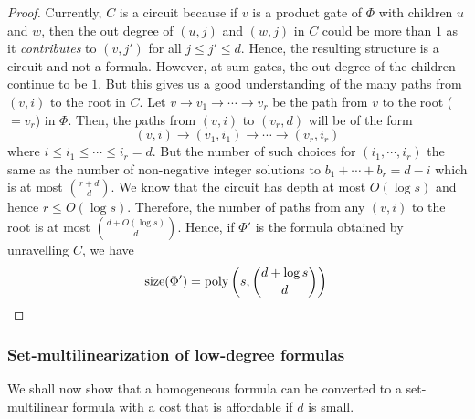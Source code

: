\begin{proof}
\medskip

Currently, $C$ is a circuit because if $v$ is a product gate of $\Phi$ with children $u$ and $w$, then the out degree of $(u, j)$ and $(w, j)$ in $C$ could be more than $1$ as it \emph{contributes} to $(v,j')$ for all $j \leq j' \leq d$.
Hence, the resulting structure is a circuit and not a formula.
However, at sum gates, the out degree of the children continue to be $1$.
But this gives us a good understanding of the many paths from $(v,i)$ to the root in $C$.
Let $v\rightarrow v_1 \rightarrow \cdots \rightarrow v_r$ be the path from $v$ to the root ($=v_r$) in $\Phi$. Then, the paths from $(v,i)$ to $(v_r,d)$ will be of the form
\[
(v,i) \rightarrow (v_1,i_1) \rightarrow \cdots \rightarrow (v_r,i_r)
\]
where $i \leq i_1 \leq \cdots \leq i_r = d$.
But the number of such choices for $(i_1,\cdots, i_r)$ the same as the number of non-negative integer solutions to $b_1 + \cdots + b_r = d-i$ which is at most $\binom{r + d}{d}$.
We know that the circuit has depth at most $O(\log s)$ and hence $r \leq O(\log s)$.
Therefore, the number of paths from any $(v,i)$ to the root is at most $\binom{d + O(\log s)}{d}$.
Hence, if $\Phi'$ is the formula obtained by unravelling $C$, we have
\[
\mathrm{size}(\Phi') = \operatorname{poly}\left(s,\binom{d+\log s}{d}\right)\qedhere
\]
\end{proof}

\subsubsection*{Set-multilinearization of low-degree formulas}

We shall now show that a homogeneous formula can be converted to a set-multilinear formula with a cost that is affordable if $d$ is small. 

